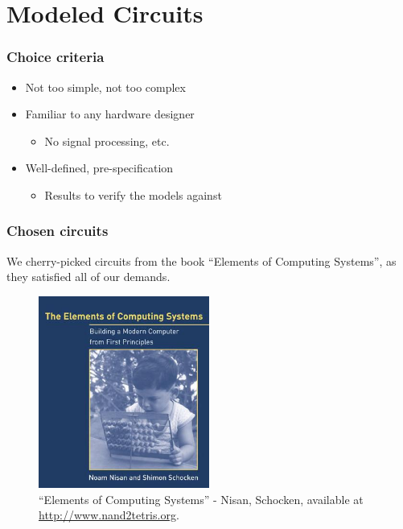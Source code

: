 \section{Modeled Circuits}
\label{sec:modeled-circuits}
    \frame{\sectionpage}

    \begin{frame}
        \frametitle{Choice criteria}

        \begin{itemize}
            \item Not too simple, not too complex
            \item Familiar to any hardware designer
                \begin{itemize}
                    \item No signal processing, etc.
                \end{itemize}
            \item Well-defined, pre-specification
                \begin{itemize}
                    \item Results to verify the models against
                \end{itemize}
        \end{itemize}
    \end{frame}

    \begin{frame}
        \frametitle{Chosen circuits}

        \par{We cherry-picked circuits from the book ``Elements of Computing Systems'',
            as they satisfied all of our demands.}

        \begin{figure}[h!]
            \includegraphics[width=0.5\textwidth]{imgs/book-cover-elements.jpg}
            \caption{``Elements of Computing Systems'' - Nisan, Schocken, \newline
                available at \url{http://www.nand2tetris.org}.
                \label{fig:book-cover-elements}
            }
        \end{figure}
    \end{frame}

